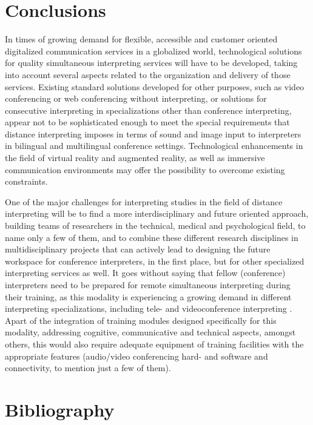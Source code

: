 \documentclass[output=paper]{langsci/langscibook}
\begin{document}
\section{Conclusions}
In times of growing demand for flexible, accessible and customer oriented digitalized communication services in a globalized world, technological solutions for quality simultaneous interpreting services will have to be developed, taking into account several aspects related to the organization and delivery of those services. Existing standard solutions developed for other purposes, such as video conferencing or web conferencing without interpreting, or solutions for consecutive interpreting in specializations other than conference interpreting, appear not to be sophisticated enough to meet the special requirements that distance interpreting imposes in terms of sound and image input to interpreters in bilingual and multilingual conference settings. Technological enhancements in the field of virtual reality and augmented reality, as well as immersive communication environments may offer the possibility to overcome existing constraints.

One of the major challenges for interpreting studies in the field of distance interpreting will be to find a more interdisciplinary and future oriented approach, building teams of researchers in the technical, medical and psychological field, to name only a few of them, and to combine these different research disciplines in multidisciplinary projects that can actively lead to designing the future workspace for conference interpreters, in the first place, but for other specialized interpreting services as well. It goes without saying that fellow (conference) interpreters need to be prepared for remote simultaneous interpreting during their training, as this modality is experiencing a growing demand in different interpreting specializations, including tele- and videoconference interpreting \citep{Braun2015}. Apart of the integration of training modules designed specifically for this modality, addressing cognitive, communicative and technical aspects, amongst others, this would also require adequate equipment of training facilities with the appropriate features (audio/video conferencing hard- and software and connectivity, to mention just a few of them).
\section{Bibliography}
\end{document}
